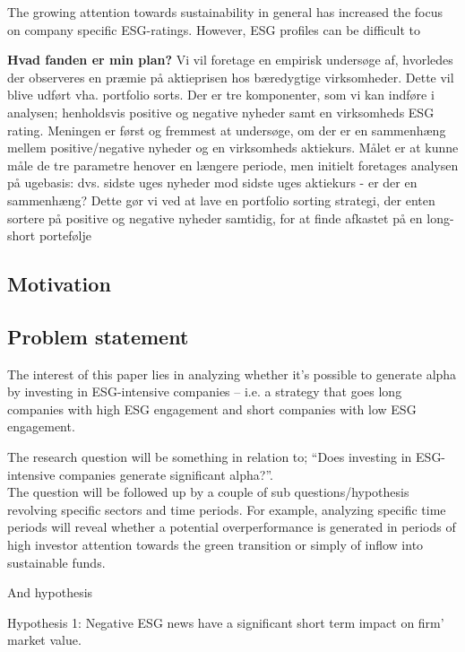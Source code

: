 The growing attention towards sustainability in general has increased the focus on company specific ESG-ratings. However, ESG profiles can be difficult to


\textbf{Hvad fanden er min plan?}
Vi vil foretage en empirisk undersøge af, hvorledes der observeres en præmie på aktieprisen hos bæredygtige virksomheder. Dette vil blive udført vha. portfolio sorts. Der er tre komponenter, som vi kan indføre i analysen; henholdsvis positive og negative nyheder samt en virksomheds ESG rating. Meningen er først og fremmest at undersøge, om der er en sammenhæng mellem positive/negative nyheder og en virksomheds aktiekurs. Målet er at kunne måle de tre parametre henover en længere periode, men initielt foretages analysen på ugebasis: dvs. sidste uges nyheder mod sidste uges aktiekurs -  er der en sammenhæng? Dette gør vi ved at lave en portfolio sorting strategi, der enten sortere på positive og negative nyheder samtidig, for at finde afkastet på en long-short portefølje 





\subsection{Motivation}

\subsection{Problem statement}

The interest of this paper lies in analyzing whether it’s possible to generate alpha by investing in ESG-intensive companies – i.e.
a strategy that goes long companies with high ESG engagement and short companies with low ESG engagement. 

The research question will be something in relation to; “Does investing in ESG-intensive companies generate significant alpha?”. \\

The question will be followed up by a couple of sub questions/hypothesis revolving specific sectors and time periods. For example, analyzing specific time periods will reveal whether a potential overperformance is generated in periods of high investor attention towards the green transition or simply of inflow into sustainable funds. 

And hypothesis

Hypothesis 1:
Negative ESG news have a significant short term impact on firm' market value.

